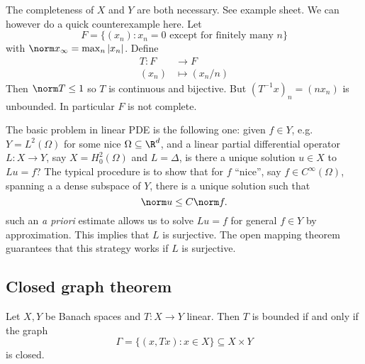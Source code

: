 \documentclass[a4paper]{article}
\begin{document}
\begin{remark}
  The completeness of \(X\) and \(Y\) are both necessary. See example sheet. We can however do a quick counterexample here. Let
  \[
    F = \{(x_n): x_n = 0 \text{ except for finitely many } n\}
  \]
  with \(\norm x_\infty = \max_n |x_n|\). Define
  \begin{align*}
    T: F &\to F \\
    (x_n) &\mapsto (x_n/n)
  \end{align*}
  Then \(\norm T \leq 1\) so \(T\) is continuous and bijective. But \((T^{-1}x)_n = (nx_n)\) is unbounded. In particular \(F\) is not complete.
\end{remark}

\begin{remark}
  The basic problem in linear PDE is the following one: given \(f \in Y\), e.g.\ \(Y = L^2(\Omega)\) for some nice \(\Omega \subseteq \R^d\), and a linear partial differential operator \(L: X \to Y\), say \(X = H_0^2(\Omega)\) and \(L = \Delta\), is there a unique solution \(u \in X\) to \(Lu = f\)? The typical procedure is to show that for \(f\) ``nice'', say \(f \in C^\infty(\Omega)\), spanning a a dense subspace of \(Y\), there is a unique solution such that
  \[
    \norm u \leq C \norm f.
  \]
  such an \emph{a priori} estimate allows us to solve \(Lu = f\) for general \(f \in Y\) by approximation. This implies that \(L\) is surjective. The open mapping theorem guarantees that this strategy works if \(L\) is surjective.
\end{remark}

\subsection{Closed graph theorem}

\begin{theorem}
  Let \(X, Y\) be Banach spaces and \(T: X \to Y\) linear. Then \(T\) is bounded if and only if the graph
  \[
    \Gamma = \{(x, Tx): x \in X\} \subseteq X \times Y
  \]
  is closed.
\end{theorem}
\end{document}
